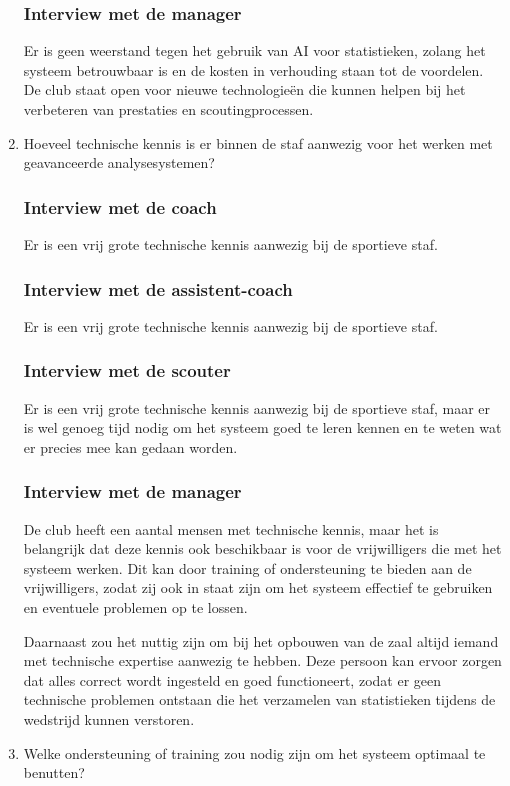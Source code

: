 \begin{enumerate}
  \subsubsection{Interview met de manager}
  Er is geen weerstand tegen het gebruik van AI voor statistieken, zolang het systeem betrouwbaar is en de kosten in verhouding staan tot de voordelen. De club staat open voor nieuwe technologieën die kunnen helpen bij het verbeteren van prestaties en scoutingprocessen.
  \item Hoeveel technische kennis is er binnen de staf aanwezig voor het werken met geavanceerde analysesystemen?
  \subsubsection{Interview met de coach}
  Er is een vrij grote technische kennis aanwezig bij de sportieve staf.
  \subsubsection{Interview met de assistent-coach}
  Er is een vrij grote technische kennis aanwezig bij de sportieve staf.
  \subsubsection{Interview met de scouter}
  Er is een vrij grote technische kennis aanwezig bij de sportieve staf, maar er is wel genoeg tijd nodig om het systeem goed te leren kennen en te weten wat er precies mee kan gedaan worden.
  \subsubsection{Interview met de manager}
  De club heeft een aantal mensen met technische kennis, maar het is belangrijk dat deze kennis ook beschikbaar is voor de vrijwilligers die met het systeem werken. Dit kan door training of ondersteuning te bieden aan de vrijwilligers, zodat zij ook in staat zijn om het systeem effectief te gebruiken en eventuele problemen op te lossen.

  Daarnaast zou het nuttig zijn om bij het opbouwen van de zaal altijd iemand met technische expertise aanwezig te hebben. Deze persoon kan ervoor zorgen dat alles correct wordt ingesteld en goed functioneert, zodat er geen technische problemen ontstaan die het verzamelen van statistieken tijdens de wedstrijd kunnen verstoren.
  \item Welke ondersteuning of training zou nodig zijn om het systeem optimaal te benutten?

\end{enumerate}
